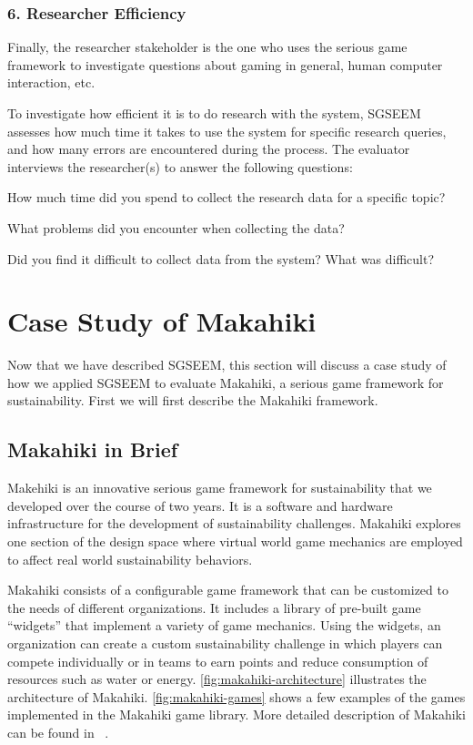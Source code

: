 \documentclass{sigchi}
\begin{document}
\subsubsection{6. Researcher Efficiency}

Finally, the researcher stakeholder is the one who uses the serious game framework to
investigate questions about gaming in general, human computer interaction, etc. 

To investigate how efficient it is to do research with the system, SGSEEM
assesses how much time it takes to use the system for specific research
queries, and how many errors are encountered during the process. The evaluator
interviews the researcher(s) to answer the following questions:
\begin{compactitem}
\item How much time did you spend to collect the research data for a
  specific topic?
\item What problems did you encounter when collecting the data?
\item Did you find it difficult to collect data from the system?
  What was difficult?
\end{compactitem}

\section{Case Study of Makahiki}

Now that we have described SGSEEM, this section will discuss
a case study of how we applied SGSEEM to evaluate Makahiki, a serious
game framework for sustainability. First we will first describe the
Makahiki framework.

\subsection{Makahiki in Brief}

Makehiki is an innovative serious game framework for sustainability that we developed
over the course of two years. It is a software and hardware infrastructure for the
development of sustainability challenges. Makahiki explores one section of the design
space where virtual world game mechanics are employed to affect real
world sustainability behaviors.

Makahiki consists of a configurable game framework that can be customized
to the needs of different organizations. It includes a library of
pre-built game ``widgets'' that implement a variety of game mechanics.
Using the widgets, an organization can create a custom sustainability
challenge in which players can compete individually or in teams to
earn points and reduce consumption of resources such as water or energy.
\autoref{fig:makahiki-architecture} illustrates the architecture of
Makahiki. \autoref{fig:makahiki-games} shows a few examples of the
games implemented in the Makahiki game library. More detailed
description of Makahiki can be found in ~\cite{csdl2-12-06}.
\end{document}
